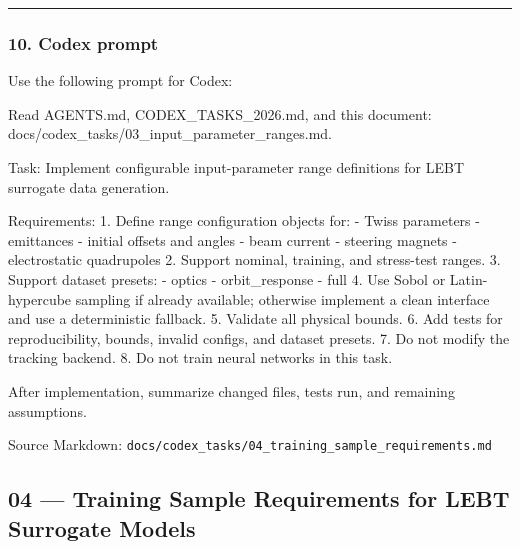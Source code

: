 \documentclass[
]{article}
\newenvironment{Shaded}{}{}
\newcommand{\NormalTok}[1]{#1}
\begin{document}
\begin{center}\rule{0.5\linewidth}{0.5pt}\end{center}

\hypertarget{codex-prompt-2}{%
\subsubsection{10. Codex prompt}\label{codex-prompt-2}}

Use the following prompt for Codex:

\begin{Shaded}
\begin{Highlighting}[]
\NormalTok{Read AGENTS.md, CODEX\_TASKS\_2026.md, and this document:}
\NormalTok{docs/codex\_tasks/03\_input\_parameter\_ranges.md.}

\NormalTok{Task:}
\NormalTok{Implement configurable input{-}parameter range definitions for LEBT surrogate}
\NormalTok{data generation.}

\NormalTok{Requirements:}
\NormalTok{1. Define range configuration objects for:}
\NormalTok{   {-} Twiss parameters}
\NormalTok{   {-} emittances}
\NormalTok{   {-} initial offsets and angles}
\NormalTok{   {-} beam current}
\NormalTok{   {-} steering magnets}
\NormalTok{   {-} electrostatic quadrupoles}
\NormalTok{2. Support nominal, training, and stress{-}test ranges.}
\NormalTok{3. Support dataset presets:}
\NormalTok{   {-} optics}
\NormalTok{   {-} orbit\_response}
\NormalTok{   {-} full}
\NormalTok{4. Use Sobol or Latin{-}hypercube sampling if already available; otherwise}
\NormalTok{   implement a clean interface and use a deterministic fallback.}
\NormalTok{5. Validate all physical bounds.}
\NormalTok{6. Add tests for reproducibility, bounds, invalid configs, and dataset presets.}
\NormalTok{7. Do not modify the tracking backend.}
\NormalTok{8. Do not train neural networks in this task.}

\NormalTok{After implementation, summarize changed files, tests run, and remaining assumptions.}
\end{Highlighting}
\end{Shaded}

Source Markdown:
\texttt{docs/codex\_tasks/04\_training\_sample\_requirements.md}

\hypertarget{training-sample-requirements-for-lebt-surrogate-models}{%
\subsection{04 --- Training Sample Requirements for LEBT Surrogate
Models}\label{training-sample-requirements-for-lebt-surrogate-models}}
\end{document}
